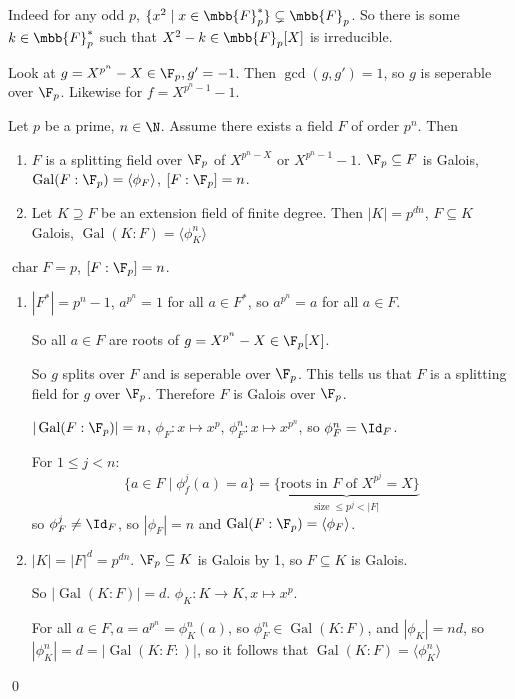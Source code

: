 \documentclass[x11names,reqno,14pt]{extarticle}
\DeclareMathOperator{\Gal}{Gal}
\DeclareMathOperator{\Char}{char}
\begin{document}
Indeed for any odd $p$, $\{x^2 \mid x \in \mbb{F}_p^*\} \subsetneq \mbb{F}_p$. So there is some $k \in \mbb{F}_p^*$ such that $X^2 - k \in \mbb{F}_p[X]$ is irreducible.

Look at $g = X^{p^n} - X \in \F_p, g' = -1$. Then $\gcd(g, g') = 1$, so $g$ is seperable over $\F_p$. Likewise for $f = X^{p^n - 1} - 1$. 

\thm

Let $p$ be a prime, $n \in \N$. Assume there exists a field $F$ of order $p^n$. Then

\begin{enumerate}

\item $F$ is a splitting field over $\F_p$ of $X^{p^n - X}$ or $X^{p^n - 1} - 1$. $\F_p \subseteq F$ is Galois, $\Gal(F:\F_p) = \langle \phi_F \rangle$, $[F:\F_p] = n$. 

\item Let $K \supseteq F$ be an extension field of finite degree. Then $|K| = p^{dn}$, $F \subseteq K$ Galois, $\Gal(K:F) =\langle \phi_K^n\rangle$

\end{enumerate}

\proof

$\Char F = p$, $[F:\F_p]=n$. 

\begin{enumerate}

\item $|F^*| = p^n - 1$, $a^{p^n} = 1$ for all $a \in F^*$, so $a^{p^n} = a$ for all $a \in F$. 

So all $a \in F$ are roots of $g = X^{p^n} - X \in \F_p[X]$.

So $g$ splits over $F$ and is seperable over $\F_p$. This tells us that $F$ is a splitting field for $g$ over $\F_p$. Therefore $F$ is Galois over $\F_p$. 

$|\Gal(F:\F_p)| = n$, $\phi_F:x\mapsto x^p$, $\phi_F^n:x\mapsto x^{p^n}$, so $\phi_F^n = \Id_F$. 

For $1 \leq j < n$:
\[
\{a\in F \mid \phi_f^j(a) = a\} = \underbrace{\{\text{roots in $F$ of } X^{p^j} = X\}}_{\text{size }\leq p^j < |F|}
\]
so $\phi_F^j\neq\Id_F$, so $|\phi_F| = n$ and $\Gal(F:\F_p) = \langle\phi_F\rangle$.

\item $|K| = |F|^d = p^{dn}$. $\F_p \subseteq K$ is Galois by 1, so $F \subseteq K$ is Galois. 

So $|\Gal(K:F)| = d$. $\phi_K:K\to K, x\mapsto x^p$. 

For all $a \in F, a = a^{p^n} = \phi_K^n(a)$, so $\phi_F^n\in\Gal(K:F)$, and $|\phi_K| = nd$, so $|\phi_K^n| = d = |\Gal(K:F:)|$, so it follows that $\Gal(K:F) = \langle\phi_K^n\rangle$

\end{enumerate}

\qed
\end{document}
